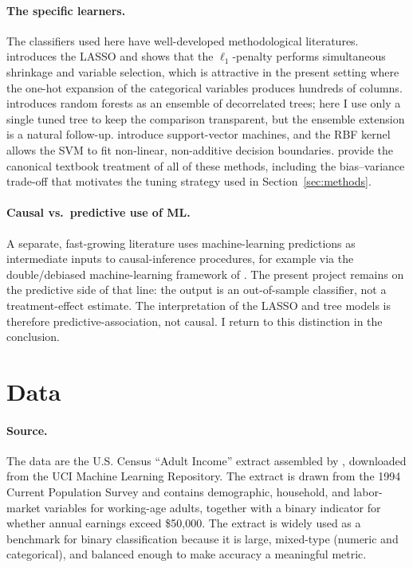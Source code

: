 \documentclass[12pt,english]{article}
\begin{document}
\paragraph{The specific learners.}
The classifiers used here have well-developed methodological literatures.
\citet{tibshirani1996} introduces the LASSO and shows that the
$\ell_1$-penalty performs simultaneous shrinkage and variable selection,
which is attractive in the present setting where the one-hot expansion of
the categorical variables produces hundreds of columns.
\citet{breiman2001} introduces random forests as an ensemble of
decorrelated trees; here I use only a single tuned tree to keep the
comparison transparent, but the ensemble extension is a natural follow-up.
\citet{cortes1995} introduce support-vector machines, and the RBF kernel
allows the SVM to fit non-linear, non-additive decision boundaries.
\citet{hastie2009} provide the canonical textbook treatment of all of these
methods, including the bias--variance trade-off that motivates the tuning
strategy used in Section~\ref{sec:methods}.

\paragraph{Causal vs.\ predictive use of ML.}
A separate, fast-growing literature uses machine-learning predictions as
intermediate inputs to causal-inference procedures, for example via the
double/debiased machine-learning framework of \citet{chernozhukov2018}.
The present project remains on the predictive side of that line: the
output is an out-of-sample classifier, not a treatment-effect estimate.
The interpretation of the LASSO and tree models is therefore
predictive-association, not causal. I return to this distinction in
the conclusion.

\section{Data}\label{sec:data}

\paragraph{Source.}
The data are the U.S. Census ``Adult Income'' extract assembled by
\citet{kohavi1996}, downloaded from the UCI Machine Learning Repository.
The extract is drawn from the 1994 Current Population Survey and contains
demographic, household, and labor-market variables for working-age adults,
together with a binary indicator for whether annual earnings exceed
\$50{,}000. The extract is widely used as a benchmark for binary
classification because it is large, mixed-type (numeric and categorical),
and balanced enough to make accuracy a meaningful metric.
\end{document}

